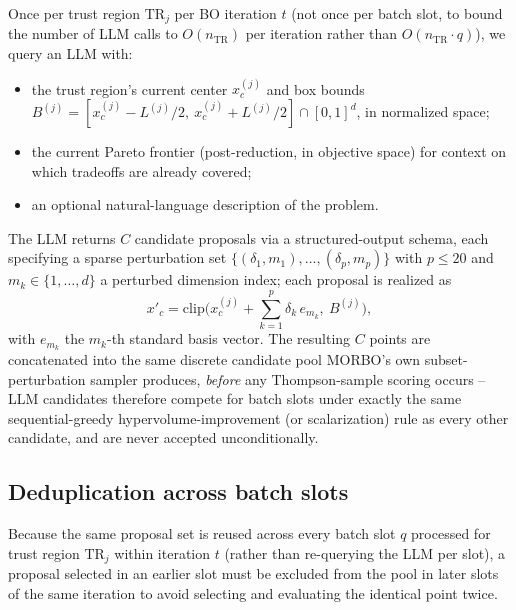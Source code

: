\documentclass[11pt]{article}
\newcommand{\TR}{\mathrm{TR}}
\begin{document}
Once per trust region $\TR_j$ per BO iteration $t$ (not once per batch
slot, to bound the number of LLM calls to $O(n_\TR)$ per iteration rather
than $O(n_\TR \cdot q)$), we query an LLM with:
\begin{itemize}[nosep]
  \item the trust region's current center $x_c^{(j)}$ and box bounds
    $B^{(j)} = [x_c^{(j)} - L^{(j)}/2,\ x_c^{(j)} + L^{(j)}/2] \cap [0,1]^d$,
    in normalized space;
  \item the current Pareto frontier (post-reduction, in objective space) for
    context on which tradeoffs are already covered;
  \item an optional natural-language description of the problem.
\end{itemize}
The LLM returns $C$ candidate proposals via a structured-output schema,
each specifying a sparse perturbation set
$\{(\delta_1, m_1), \dots, (\delta_p, m_p)\}$ with $p \le 20$ and
$m_k \in \{1,\dots,d\}$ a perturbed dimension index; each proposal is
realized as
\begin{equation}
  x'_c = \mathrm{clip}\Big(x_c^{(j)} + \textstyle\sum_{k=1}^p \delta_k\, e_{m_k},\ B^{(j)}\Big),
\end{equation}
with $e_{m_k}$ the $m_k$-th standard basis vector. The resulting $C$
points are concatenated into the same discrete candidate pool MORBO's own
subset-perturbation sampler produces, \emph{before} any Thompson-sample
scoring occurs -- LLM candidates therefore compete for batch slots under
exactly the same sequential-greedy hypervolume-improvement (or
scalarization) rule as every other candidate, and are never accepted
unconditionally.

\subsection{Deduplication across batch slots}

Because the same proposal set is reused across every batch slot $q$
processed for trust region $\TR_j$ within iteration $t$ (rather than
re-querying the LLM per slot), a proposal selected in an earlier slot must
be excluded from the pool in later slots of the same iteration to avoid
selecting and evaluating the identical point twice.
\end{document}
